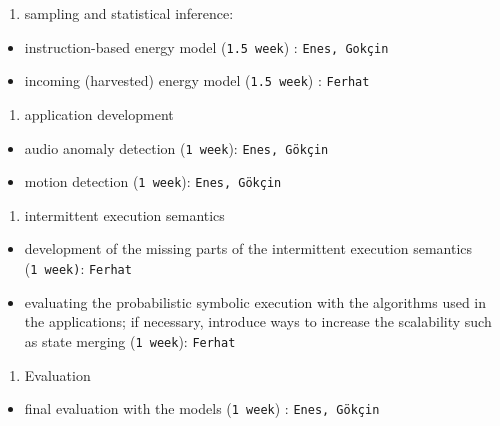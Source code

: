 \documentclass[]{article}
\providecommand{\tightlist}{%
  \setlength{\itemsep}{0pt}\setlength{\parskip}{0pt}}
\begin{document}
\begin{enumerate}
\def\labelenumi{\arabic{enumi}.}
\tightlist
\item
  sampling and statistical inference:
\end{enumerate}

\begin{itemize}
\tightlist
\item
  instruction-based energy model (\texttt{1.5\ week}) : \texttt{Enes,\ Gokçin}
\item
  incoming (harvested) energy model (\texttt{1.5\ week}) : \texttt{Ferhat}
\end{itemize}

\begin{enumerate}
\def\labelenumi{\arabic{enumi}.}
\setcounter{enumi}{1}
\tightlist
\item
  application development
\end{enumerate}

\begin{itemize}
\tightlist
\item
  audio anomaly detection (\texttt{1\ week}): \texttt{Enes,\ Gökçin}
\item
  motion detection (\texttt{1\ week}): \texttt{Enes,\ Gökçin}
\end{itemize}

\begin{enumerate}
\def\labelenumi{\arabic{enumi}.}
\setcounter{enumi}{2}
\tightlist
\item
  intermittent execution semantics
\end{enumerate}

\begin{itemize}
\tightlist
\item
  development of the missing parts of the intermittent execution semantics (\texttt{1\ week)}: \texttt{Ferhat}
\item
  evaluating the probabilistic symbolic execution with the algorithms used in the applications; if necessary, introduce ways to increase the scalability such as state merging (\texttt{1\ week}): \texttt{Ferhat}
\end{itemize}

\begin{enumerate}
\def\labelenumi{\arabic{enumi}.}
\setcounter{enumi}{3}
\tightlist
\item
  Evaluation
\end{enumerate}

\begin{itemize}
\tightlist
\item
  final evaluation with the models (\texttt{1\ week}) : \texttt{Enes,\ Gökçin}
\end{itemize}
\end{document}
